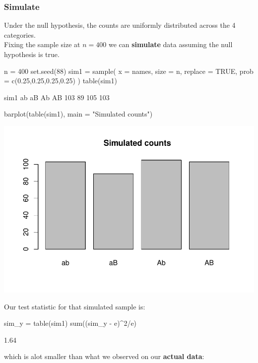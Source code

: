\documentclass[a4paper]{article}\usepackage[]{graphicx}\usepackage[]{xcolor}
\makeatletter
\def\maxwidth{ %
  \ifdim\Gin@nat@width>\linewidth
    \linewidth
  \else
    \Gin@nat@width
  \fi
}
\makeatother
\begin{document}
\subsubsection{Simulate}
Under the null hypothesis, the counts are uniformly distributed across the 4 categories.\\
Fixing the sample size at \( n = 400 \) we can \textbf{simulate} data assuming the null hypothesis is true.
\begin{Schunk}
\begin{Sinput}
n = 400
set.seed(88)
sim1 = sample(
  x = names,
  size = n,
  replace = TRUE,
  prob = c(0.25,0.25,0.25,0.25)
)
table(sim1)
\end{Sinput}
\begin{Soutput}
sim1
 ab  aB  Ab  AB 
103  89 105 103 
\end{Soutput}
\begin{Sinput}
barplot(table(sim1), main = "Simulated counts")
\end{Sinput}


{\centering \includegraphics[width=\maxwidth]{figure/listings-unnamed-chunk-18-1} 

}

\end{Schunk}
Our test statistic for that simulated sample is:
\begin{Schunk}
\begin{Sinput}
sim_y = table(sim1)
sum((sim_y - e)^2/e)
\end{Sinput}
\begin{Soutput}
[1] 1.64
\end{Soutput}
\end{Schunk}
which is alot smaller than what we observed on our \textbf{actual data}:
\end{document}
